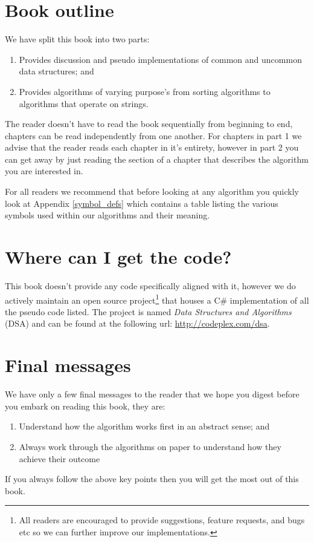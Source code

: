 \section{Book outline}
We have split this book into two parts:

\begin{enumerate}
\item[Part 1:] Provides discussion and pseudo implementations of common and uncommon data structures; and
\item[Part 2:] Provides algorithms of varying purpose's from sorting algorithms to algorithms that operate on strings.
\end{enumerate}

The reader doesn't have to read the book sequentially from beginning to end, chapters can be read independently from one another. For chapters in part 1 we advise that the reader reads each chapter in it's entirety, however in part 2 you can get away by just reading the section of a chapter that describes the algorithm you are interested in.

For all readers we recommend that before looking at any algorithm you quickly look at Appendix \ref{symbol_defs} which contains a table listing the various symbols used within our algorithms and their meaning.

\section{Where can I get the code?} \label{intro_source_code}
This book doesn't provide any code specifically aligned with it, however we do actively maintain an open source project\footnote{All readers are encouraged to provide suggestions, feature requests, and bugs etc so we can further improve our implementations.} that houses a C\# implementation of all the pseudo code listed. The project is named \textit{Data Structures and Algorithms} (DSA) and can be found at the following url: \url{http://codeplex.com/dsa}.

\section{Final messages}
We have only a few final messages to the reader that we hope you digest before you embark on reading this book, they are:

\begin{enumerate}
\item Understand how the algorithm works first in an abstract sense; and
\item Always work through the algorithms on paper to understand how they achieve their outcome
\end{enumerate}

If you always follow the above key points then you will get the most out of this book.
